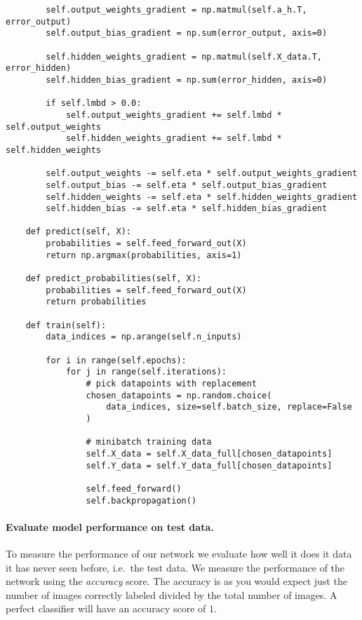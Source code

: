 \begin{verbatim}
        self.output_weights_gradient = np.matmul(self.a_h.T, error_output)
        self.output_bias_gradient = np.sum(error_output, axis=0)

        self.hidden_weights_gradient = np.matmul(self.X_data.T, error_hidden)
        self.hidden_bias_gradient = np.sum(error_hidden, axis=0)

        if self.lmbd > 0.0:
            self.output_weights_gradient += self.lmbd * self.output_weights
            self.hidden_weights_gradient += self.lmbd * self.hidden_weights

        self.output_weights -= self.eta * self.output_weights_gradient
        self.output_bias -= self.eta * self.output_bias_gradient
        self.hidden_weights -= self.eta * self.hidden_weights_gradient
        self.hidden_bias -= self.eta * self.hidden_bias_gradient

    def predict(self, X):
        probabilities = self.feed_forward_out(X)
        return np.argmax(probabilities, axis=1)

    def predict_probabilities(self, X):
        probabilities = self.feed_forward_out(X)
        return probabilities

    def train(self):
        data_indices = np.arange(self.n_inputs)

        for i in range(self.epochs):
            for j in range(self.iterations):
                # pick datapoints with replacement
                chosen_datapoints = np.random.choice(
                    data_indices, size=self.batch_size, replace=False
                )

                # minibatch training data
                self.X_data = self.X_data_full[chosen_datapoints]
                self.Y_data = self.Y_data_full[chosen_datapoints]

                self.feed_forward()
                self.backpropagation()

\end{verbatim}


\paragraph{Evaluate model performance on test data.}
To measure the performance of our network we evaluate how well it does it data it has never seen before, i.e.~the test data.  
We measure the performance of the network using the \emph{accuracy} score.  
The accuracy is as you would expect just the number of images correctly labeled divided by the total number of images. A perfect classifier will have an accuracy score of $1$.  

